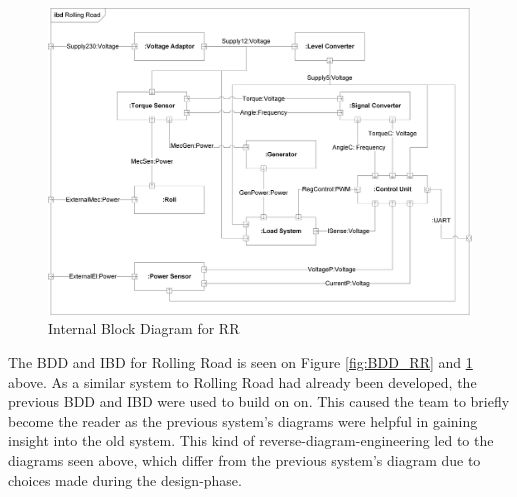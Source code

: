 \begin{figure}[H]
	\centering
	\includegraphics[width=1\linewidth]{Architecture/IBD_RR}
	\caption{Internal Block Diagram for RR}
	\label{fig:IBD_RR}
\end{figure}

The BDD and IBD for Rolling Road is seen on Figure \ref{fig:BDD_RR} and \ref{fig:IBD_RR} above. As a similar system to Rolling Road had already been developed, the previous BDD and IBD were used to build on on. This caused the team to briefly become the reader as the previous system's diagrams were helpful in gaining insight into the old system. This kind of reverse-diagram-engineering led to the diagrams seen above, which differ from the previous system's diagram due to choices made during the design-phase.